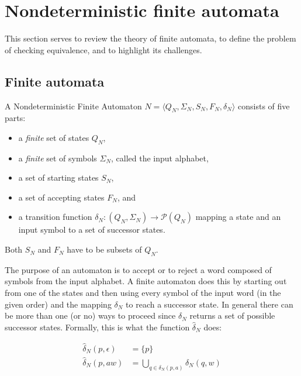 \section{Nondeterministic finite automata}

This section serves to review the theory of finite automata, to define the
problem of checking equivalence, and to highlight its challenges.

\subsection{Finite automata}

\begin{definition}
  A Nondeterministic Finite Automaton $N = \langle Q_N, \Sigma_N, S_N, F_N, \delta_N \rangle$ consists of five parts:

  \begin{itemize}
    \item a \textit{finite} set of states $Q_N$,
    \item a \textit{finite} set of symbols $\Sigma_N$, called the input alphabet,
    \item a set of starting states $S_N$,
    \item a set of accepting states $F_N$, and
    \item a transition function $\delta_N : (Q_N, \Sigma_N) \to \mathcal{P}(Q_N)$ mapping a state and an input symbol
            to a set of successor states.
  \end{itemize}

  Both $S_N$ and $F_N$ have to be subsets of $Q_N$.
\end{definition}

The purpose of an automaton is to accept or to reject a word
composed of symbols from the input alphabet.
A finite automaton does this by starting out from one of the
states and then using every symbol of the input word (in the given
order) and the mapping $\delta_N$ to reach a successor state.
In general there can be more than one (or no) ways to proceed since $\delta_N$ returns a set of possible successor states.
Formally, this is what the function $\hat{\delta}_N$ does:

\begin{definition}
  \begin{align*}
    \hat{\delta}_N(p, \epsilon) &= \{p\}\\
    \hat{\delta}_N(p, aw) &= \bigcup_{q \in \delta_N(p, a)}\hat{\delta}_N(q, w)
  \end{align*}
\end{definition}

